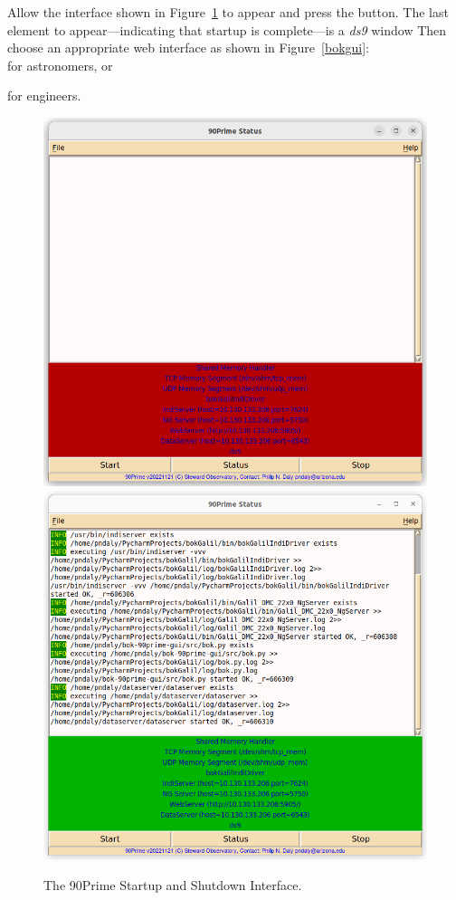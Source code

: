 \documentclass[12pt,twoside]{article}
\begin{document}
\noindent Allow the interface shown in Figure~\ref{boktcl} to appear and press the  button. The last element
to appear---indicating that startup is complete---is a \emph{ds9} window  Then choose an appropriate web interface as shown 
in Figure~\ref{bokgui}: \\

 for astronomers, or

 for engineers. \\

\begin{figure}[!h]
 \centering
 \includegraphics[width=0.4\linewidth]{bokSplashOff.png}
 \includegraphics[width=0.4\linewidth]{bokSplashOn.png}
 \caption{The 90Prime Startup and Shutdown Interface.}
 \label{boktcl}
\end{figure}
\end{document}
